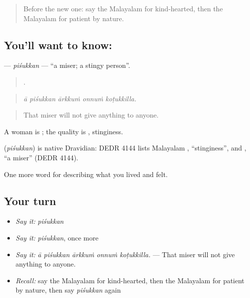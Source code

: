 \label{lesson:ML-C527-pisukkan}



\begin{quote}
Before the new one: say the Malayalam for kind-hearted, then the Malayalam for patient by nature.
\end{quote}

\subsection*{You'll want to know: }
\textbf{} — \emph{piśukkan} — \textquotedblleft{}a miser; a stingy person\textquotedblright{}.

\begin{quote}
    .
\end{quote}

\begin{quote}
\emph{ā piśukkan ārkkuṁ onnuṁ koṭukkilla.}
\end{quote}

\begin{quote}
That miser will not give anything to anyone.
\end{quote}

A woman is ; the quality is , stinginess.

\begin{cousinweb}
\textbf{} (\emph{piśukkan}) is native Dravidian: DEDR 4144 lists Malayalam , \textquotedblleft{}stinginess\textquotedblright{}, and , \textquotedblleft{}a miser\textquotedblright{} (DEDR 4144).
\end{cousinweb}

\begin{grammarlens}[title={What you've built}]
One more word for describing what you lived and felt.
\end{grammarlens}

\subsection*{Your turn}
\begin{itemize}
\raggedright
  \item \emph{Say it:} \emph{piśukkan}
  \item \emph{Say it:} \emph{piśukkan}, once more
  \item \emph{Say it:} \emph{ā piśukkan ārkkuṁ onnuṁ koṭukkilla.} — That miser will not give anything to anyone.
  \item \emph{Recall:} say the Malayalam for kind-hearted, then the Malayalam for patient by nature, then say \emph{piśukkan} again
\end{itemize}

